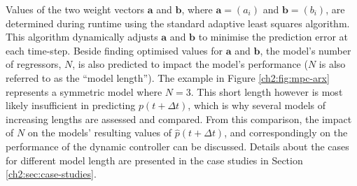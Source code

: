 Values of the two weight vectors $\textbf{a}$ and $\textbf{b}$, where $\textbf{a} = (a_i)$ and $\textbf{b} = (b_i)$, are determined during runtime using the standard adaptive least squares algorithm.
This algorithm dynamically adjusts $\textbf{a}$ and $\textbf{b}$ to minimise the prediction error at each time-step.
Beside finding optimised values for $\textbf{a}$ and $\textbf{b}$, the model's number of regressors, $N$, is also predicted to impact the model's performance ($N$ is also referred to as the ``model length'').
The example in Figure \ref{ch2:fig:mpc-arx} represents a symmetric model where $N=3$.
This short length however is most likely insufficient in predicting $p(t+\Delta t)$, which is why several models of increasing lengths are assessed and compared.
From this comparison, the impact of $N$ on the models' resulting values of $\hat{p}(t+\Delta t)$, and correspondingly on the performance of the dynamic controller can be discussed.
Details about the cases for different model length are presented in the case studies in Section \ref{ch2:sec:case-studies}.










